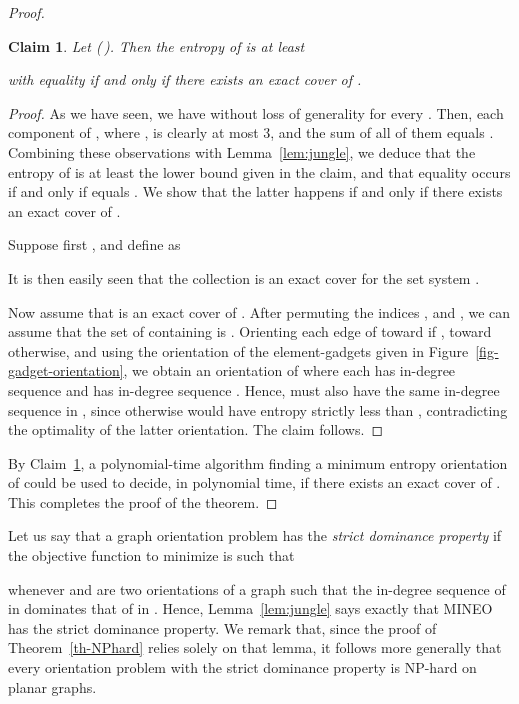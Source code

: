 \documentclass[11pt]{article}
\newtheorem{claim}{Claim}
\begin{document}
\begin{proof}
\begin{claim}
\label{claim-exact-cover}
Let  (\,). Then the entropy of  is at least

with equality if and only if there exists an exact cover of .
\end{claim}
\begin{proof}
As we have seen, we have without loss of generality  for every . Then, each component of , where , is clearly at most 3, and the sum of all of them equals . 
Combining these observations with Lemma~\ref{lem:jungle}, we deduce that the entropy of  is at least the lower bound given in the claim, and that equality occurs if and only if  equals . We show that the latter happens if and only if there exists an exact cover of .

Suppose first  , and define  as

It is then easily seen that the collection  is an exact cover for the set system .

Now assume that  is an exact cover of . After permuting the indices ,  and , we can assume that the set of  containing  is . Orienting each edge  of  toward  if , toward  otherwise, and using the orientation of the element-gadgets given in Figure~\ref{fig-gadget-orientation}, we obtain an orientation  of  where each 
 has in-degree sequence  and  has in-degree sequence . Hence,  must also have the same in-degree sequence in , since otherwise  would have entropy strictly less than , contradicting the optimality of the latter orientation. The claim follows.
\end{proof}

By Claim~\ref{claim-exact-cover}, a polynomial-time algorithm finding
a minimum entropy orientation of  could be used to decide, in polynomial time, if there exists an exact cover of . This completes the proof of the theorem.
\end{proof}

Let us say that a graph orientation problem has the {\em strict dominance property} if the objective function  to minimize is such that 

whenever  and  are two orientations of a graph  such that the in-degree sequence of  in  dominates that of  in  . Hence, Lemma~\ref{lem:jungle} says exactly that MINEO has the strict dominance property. We remark that, since the proof of Theorem~\ref{th-NPhard} relies solely on that lemma, it follows more generally that every orientation problem with the strict dominance property is NP-hard on planar graphs.
\end{document}
